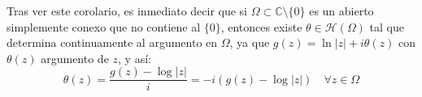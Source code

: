 Tras ver este corolario, es inmediato decir que si $\Omega \subset \mathbb{C} \setminus \{0\}$ es un abierto simplemente conexo que no contiene al $\{0\}$, entonces existe $\theta \in \mathcal{H}(\Omega)$ tal que determina continuamente al argumento en $\Omega$, ya que $g(z) = \ln|z| + i \theta(z)$ con $\theta(z)$ argumento de $z$, y así:
\[
    \theta(z) = 
    \frac{g(z) - \log|z|}{i} = 
    -i \left( g(z) - \log|z| \right) \quad \forall z \in \Omega
\]